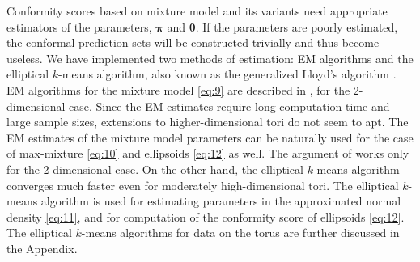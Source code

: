 Conformity scores based on mixture model and its variants need appropriate estimators of the parameters, $\boldsymbol{\pi}$ and $\boldsymbol{\theta}$. If the parameters are poorly estimated, the conformal prediction sets will be constructed trivially and thus become useless. We have implemented two methods of estimation: EM algorithms and the elliptical $k$-means algorithm, also known as the generalized Lloyd's algorithm \citep{Sung:1998, Bishop, Shin:2019}. EM algorithms for the mixture model \eqref{eq:9} are described in \citet{Jung:2021}, for the 2-dimensional case. Since the EM estimates require long computation time and large sample sizes, extensions to higher-dimensional tori do not seem to apt. The EM estimates of the mixture model parameters can be naturally used for the case of max-mixture \eqref{eq:10} and ellipsoids \eqref{eq:12} as well. The argument {} of  works only for the 2-dimensional case. On the other hand, the elliptical $k$-means algorithm converges much faster even for moderately high-dimensional tori. The elliptical $k$-means algorithm is used for estimating parameters in the approximated normal density \eqref{eq:11}, and for computation of the conformity score of ellipsoids \eqref{eq:12}. The elliptical $k$-means algorithms for data on the torus are further discussed in the Appendix.



